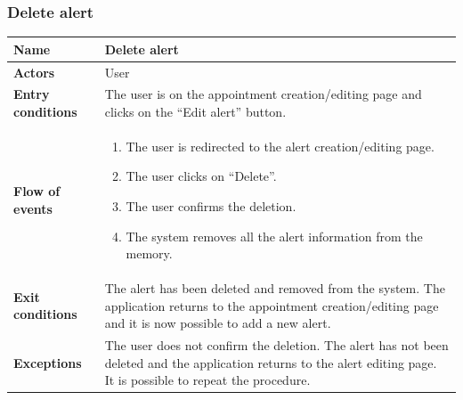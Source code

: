 \subsubsection{Delete alert}
\begin{table}[!h]
	\centering
	{\renewcommand{\arraystretch}{2}%
		\begin{tabular}{|l|p{12cm}|}
			\hline
			\textbf{Name} 				& \textbf{Delete alert} \\ \hline
			\textbf{Actors} 			& User \\ \hline
			\textbf{Entry conditions} 	& The user is on the appointment creation/editing page and clicks on the “Edit alert” button. \\ \hline
			\textbf{Flow of events}		& \begin{minipage}[t]{0.75\textwidth}
				\begin{enumerate}
					\item The user is redirected to the alert creation/editing page.
					\item The user clicks on “Delete”. 
					\item The user confirms the deletion.
					\item The system removes all the alert information from the memory.
				\end{enumerate}
			\end{minipage}	\\ \hline
			\textbf{Exit conditions}	& The alert has been deleted and removed from the system. The application returns to the appointment creation/editing page and it is now possible to add a new alert.  \\ \hline
			\textbf{Exceptions}			& The user does not confirm the deletion. The alert has not been deleted and the application returns to the alert editing page. It is possible to repeat the procedure.  \\ \hline
	\end{tabular}}
\end{table}

